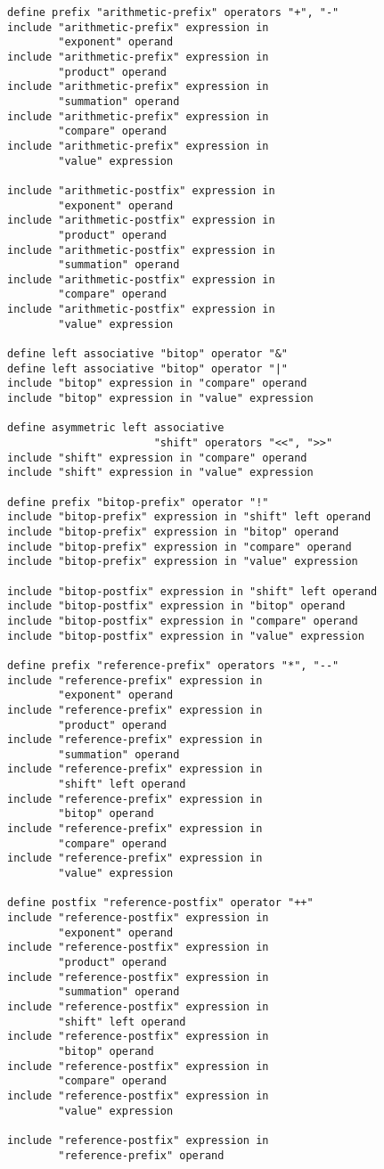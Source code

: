 \documentclass[12pt]{article}
\newenvironment{indpar}[1][0.3in]%
	{\begin{list}{}%
		     {\setlength{\itemsep}{0in}%
		      \setlength{\topsep}{0in}%
		      \setlength{\parsep}{1ex}%
		      \setlength{\labelwidth}{#1}%
		      \setlength{\leftmargin}{#1}%
		      \addtolength{\leftmargin}{\labelsep}}%
	 \item}%
	{\end{list}}
\begin{document}
\begin{indpar}
\begin{verbatim}
define prefix "arithmetic-prefix" operators "+", "-"
include "arithmetic-prefix" expression in
        "exponent" operand
include "arithmetic-prefix" expression in
        "product" operand
include "arithmetic-prefix" expression in
        "summation" operand
include "arithmetic-prefix" expression in
        "compare" operand
include "arithmetic-prefix" expression in
        "value" expression

include "arithmetic-postfix" expression in
        "exponent" operand
include "arithmetic-postfix" expression in
        "product" operand
include "arithmetic-postfix" expression in
        "summation" operand
include "arithmetic-postfix" expression in
        "compare" operand
include "arithmetic-postfix" expression in
        "value" expression

define left associative "bitop" operator "&"
define left associative "bitop" operator "|"
include "bitop" expression in "compare" operand
include "bitop" expression in "value" expression

define asymmetric left associative
                       "shift" operators "<<", ">>"
include "shift" expression in "compare" operand
include "shift" expression in "value" expression

define prefix "bitop-prefix" operator "!"
include "bitop-prefix" expression in "shift" left operand
include "bitop-prefix" expression in "bitop" operand
include "bitop-prefix" expression in "compare" operand
include "bitop-prefix" expression in "value" expression

include "bitop-postfix" expression in "shift" left operand
include "bitop-postfix" expression in "bitop" operand
include "bitop-postfix" expression in "compare" operand
include "bitop-postfix" expression in "value" expression

define prefix "reference-prefix" operators "*", "--"
include "reference-prefix" expression in
        "exponent" operand
include "reference-prefix" expression in
        "product" operand
include "reference-prefix" expression in
        "summation" operand
include "reference-prefix" expression in
        "shift" left operand
include "reference-prefix" expression in
        "bitop" operand
include "reference-prefix" expression in
        "compare" operand
include "reference-prefix" expression in
        "value" expression

define postfix "reference-postfix" operator "++"
include "reference-postfix" expression in
        "exponent" operand
include "reference-postfix" expression in
        "product" operand
include "reference-postfix" expression in
        "summation" operand
include "reference-postfix" expression in
        "shift" left operand
include "reference-postfix" expression in
        "bitop" operand
include "reference-postfix" expression in
        "compare" operand
include "reference-postfix" expression in
        "value" expression

include "reference-postfix" expression in
        "reference-prefix" operand
\end{verbatim}\end{indpar}
\end{document}
